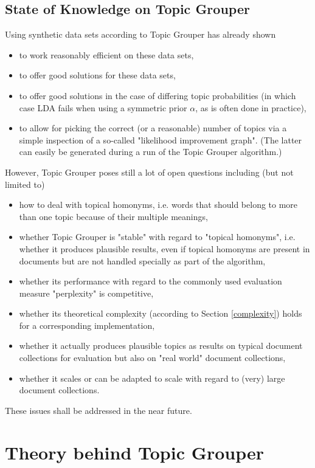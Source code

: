 \documentclass[10pt, a4paper, oneside]{article}
\begin{document}
\subsection{State of Knowledge on Topic Grouper}

Using synthetic data sets according to \cite{Tan_topic-weak-correlatedlatent} Topic Grouper has already shown
\begin{itemize}
\item to work reasonably efficient on these data sets,
\item to offer good solutions for these data sets,
\item to offer good solutions in the case of differing topic probabilities (in which case LDA fails when using a symmetric prior $\alpha$, as is often done in practice),
\item to allow for picking the correct (or a reasonable) number of topics via a simple inspection of a so-called "likelihood improvement graph". (The latter can easily be generated during a run of the Topic Grouper algorithm.)
\end{itemize}

However, Topic Grouper poses still a lot of open questions including (but not limited to)
\begin{itemize}
\item how to deal with topical homonyms, i.e. words that should belong to more than one topic because of their multiple meanings,
\item whether Topic Grouper is "stable" with regard to "topical homonyms", i.e. whether it produces plausible results, even if topical homonyms are present in documents but are not handled specially as part of the algorithm,
\item whether its performance with regard to the commonly used evaluation measure "perplexity" is competitive,
\item whether its theoretical complexity (according to Section \ref{complexity}) holds for a corresponding implementation,
\item whether it actually produces plausible topics as results on typical document collections for evaluation but also on "real world" document collections,
\item whether it scales or can be adapted to scale with regard to (very) large document collections.
\end{itemize}
These issues shall be addressed in the near future.

\section{Theory behind Topic Grouper}
\end{document}
